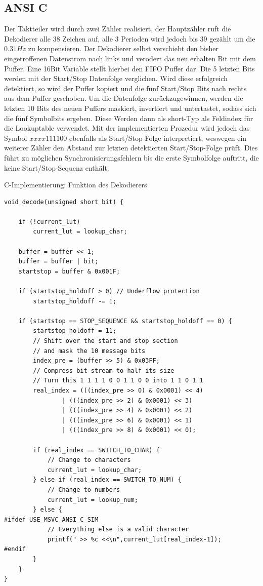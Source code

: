 \documentclass{article}
\begin{document}
\subsection{ANSI C} 
Der Taktteiler wird durch zwei Zähler realisiert, der Hauptzähler ruft die Dekodierer alle 38 
Zeichen auf, alle 3 Perioden wird jedoch bis 39 gezählt um die $0.31Hz$ zu kompensieren. 
Der Dekodierer selbst verschiebt den bisher eingetroffenen Datenstrom nach links und verodert 
das neu erhalten Bit mit dem Puffer. Eine 16Bit Variable stellt hierbei den FIFO Puffer dar. 
Die 5 letzten Bits werden mit der Start/Stop Datenfolge verglichen. Wird diese erfolgreich 
detektiert, so wird der Puffer kopiert und die fünf Start/Stop Bits nach rechts aus dem 
Puffer geschoben. Um die Datenfolge zurückzugewinnen, werden die letzten 10 Bits des neuen 
Puffers maskiert, invertiert und untertastet, sodass sich die fünf Symbolbits ergeben.
Diese Werden dann als short-Typ als Feldindex für die Lookuptable verwendet.
Mit der implementierten Prozedur wird jedoch das Symbol $xxxx111100$ ebenfalls als 
Start/Stop-Folge interpretiert, weswegen ein weiterer Zähler den Abstand zur letzten detektierten Start/Stop-Folge prüft. Dies führt zu möglichen Synchronisierungsfehlern bis die erste Symbolfolge auftritt, die keine Start/Stop-Sequenz enthält. 

\begin{listing}\label{codeC:decode}
    \caption{C-Implementierung: Funktion des Dekodierers}
    \begin{verbatim}
void decode(unsigned short bit) {

    if (!current_lut) 
        current_lut = lookup_char;

    buffer = buffer << 1;
    buffer = buffer | bit;
    startstop = buffer & 0x001F;

    if (startstop_holdoff > 0) // Underflow protection
        startstop_holdoff -= 1;

    if (startstop == STOP_SEQUENCE && startstop_holdoff == 0) {
        startstop_holdoff = 11;
        // Shift over the start and stop section
        // and mask the 10 message bits
        index_pre = (buffer >> 5) & 0x03FF; 
        // Compress bit stream to half its size
        // Turn this 1 1 1 1 0 0 1 1 0 0 into 1 1 0 1 1
        real_index = (((index_pre >> 0) & 0x0001) << 4) 
                | (((index_pre >> 2) & 0x0001) << 3) 
                | (((index_pre >> 4) & 0x0001) << 2) 
                | (((index_pre >> 6) & 0x0001) << 1) 
                | (((index_pre >> 8) & 0x0001) << 0);

        if (real_index == SWITCH_TO_CHAR) {
            // Change to characters
            current_lut = lookup_char;
        } else if (real_index == SWITCH_TO_NUM) {
            // Change to numbers
            current_lut = lookup_num;
        } else {
#ifdef USE_MSVC_ANSI_C_SIM
            // Everything else is a valid character
            printf(" >> %c <<\n",current_lut[real_index-1]); 
#endif
        }
    }
}
    \end{verbatim}
\end{listing}
\end{document}
